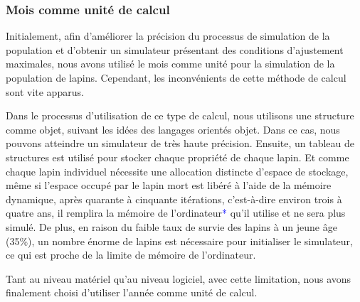 \documentclass[12pt]{article}
\begin{document}
            \subsubsection{Mois comme unité de calcul}
            Initialement, afin d'améliorer la précision du processus de simulation de la population et d'obtenir un simulateur présentant des conditions d'ajustement maximales, nous avons utilisé le mois comme unité pour la simulation de la population de lapins. Cependant, les inconvénients de cette méthode de calcul sont vite apparus.
            \par
            Dans le processus d'utilisation de ce type de calcul, nous utilisons une structure comme objet, suivant les idées des langages orientés objet. Dans ce cas, nous pouvons atteindre un simulateur de très haute précision. Ensuite, un tableau de structures est utilisé pour stocker chaque propriété de chaque lapin. Et comme chaque lapin individuel nécessite une allocation distincte d'espace de stockage, même si l'espace occupé par le lapin mort est libéré à l'aide de la mémoire dynamique, après quarante à cinquante itérations, c'est-à-dire environ trois à quatre ans, il remplira la mémoire de l'ordinateur{\textcolor{blue}{*}} qu'il utilise et ne sera plus simulé. De plus, en raison du faible taux de survie des lapins à un jeune âge (35\%), un nombre énorme de lapins est nécessaire pour initialiser le simulateur, ce qui est proche de la limite de mémoire de l'ordinateur.
            \par
            Tant au niveau matériel qu'au niveau logiciel, avec cette limitation, nous avons finalement choisi d'utiliser l'année comme unité de calcul.
\end{document}
